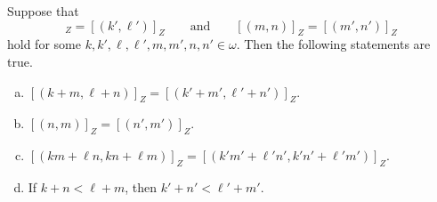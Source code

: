 \documentclass[11pt]{article}
\begin{document}
\begin{proposition}
  Suppose that
  \begin{equation*}
    [(k, \ell)]_Z = [(k', \ell')]_Z \qquad \text{and} \qquad [(m, n)]_Z = [(m', n')]_Z
  \end{equation*}
  hold for some $k, k', \ell, \ell', m, m', n, n' \in \omega$.
  Then the following statements are true.
  \begin{enumerate}[(a)]
    \item $[(k + m, \ell + n)]_Z = [(k' + m', \ell' + n')]_Z$.
    \item $[(n, m)]_Z = [(n', m')]_Z$.
    \item $[(km + \ell n, kn + \ell m)]_Z = [(k'm' + \ell'n', k'n' + \ell'm')]_Z$.
    \item If $k + n < \ell + m$, then $k' + n' < \ell' + m'$.
  \end{enumerate}
\end{proposition}
\end{document}
